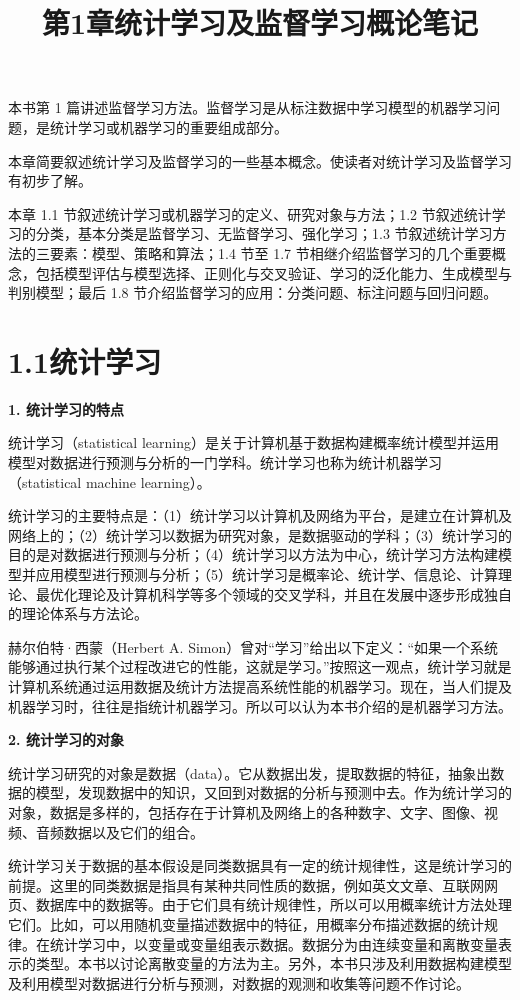 \documentclass[UTF8,12pt,a4paper,fontset=fandol]{ctexart}
\title{第1章\quad 统计学习及监督学习概论笔记}
\author{}
\date{}
\begin{document}
\maketitle

本书第 1 篇讲述监督学习方法。监督学习是从标注数据中学习模型的机器学习问题，是统计学习或机器学习的重要组成部分。

本章简要叙述统计学习及监督学习的一些基本概念。使读者对统计学习及监督学习有初步了解。

本章 1.1 节叙述统计学习或机器学习的定义、研究对象与方法；1.2 节叙述统计学习的分类，基本分类是监督学习、无监督学习、强化学习；1.3 节叙述统计学习方法的三要素：模型、策略和算法；1.4 节至 1.7 节相继介绍监督学习的几个重要概念，包括模型评估与模型选择、正则化与交叉验证、学习的泛化能力、生成模型与判别模型；最后 1.8 节介绍监督学习的应用：分类问题、标注问题与回归问题。

\section*{1.1\quad 统计学习}

\noindent\textbf{1. 统计学习的特点}

统计学习（statistical learning）是关于计算机基于数据构建概率统计模型并运用模型对数据进行预测与分析的一门学科。统计学习也称为统计机器学习（statistical machine learning）。

统计学习的主要特点是：（1）统计学习以计算机及网络为平台，是建立在计算机及网络上的；（2）统计学习以数据为研究对象，是数据驱动的学科；（3）统计学习的目的是对数据进行预测与分析；（4）统计学习以方法为中心，统计学习方法构建模型并应用模型进行预测与分析；（5）统计学习是概率论、统计学、信息论、计算理论、最优化理论及计算机科学等多个领域的交叉学科，并且在发展中逐步形成独自的理论体系与方法论。

赫尔伯特·西蒙（Herbert A. Simon）曾对“学习”给出以下定义：“如果一个系统能够通过执行某个过程改进它的性能，这就是学习。”按照这一观点，统计学习就是计算机系统通过运用数据及统计方法提高系统性能的机器学习。现在，当人们提及机器学习时，往往是指统计机器学习。所以可以认为本书介绍的是机器学习方法。

\noindent\textbf{2. 统计学习的对象}

统计学习研究的对象是数据（data）。它从数据出发，提取数据的特征，抽象出数据的模型，发现数据中的知识，又回到对数据的分析与预测中去。作为统计学习的对象，数据是多样的，包括存在于计算机及网络上的各种数字、文字、图像、视频、音频数据以及它们的组合。

统计学习关于数据的基本假设是同类数据具有一定的统计规律性，这是统计学习的前提。这里的同类数据是指具有某种共同性质的数据，例如英文文章、互联网网页、数据库中的数据等。由于它们具有统计规律性，所以可以用概率统计方法处理它们。比如，可以用随机变量描述数据中的特征，用概率分布描述数据的统计规律。在统计学习中，以变量或变量组表示数据。数据分为由连续变量和离散变量表示的类型。本书以讨论离散变量的方法为主。另外，本书只涉及利用数据构建模型及利用模型对数据进行分析与预测，对数据的观测和收集等问题不作讨论。
\end{document}
